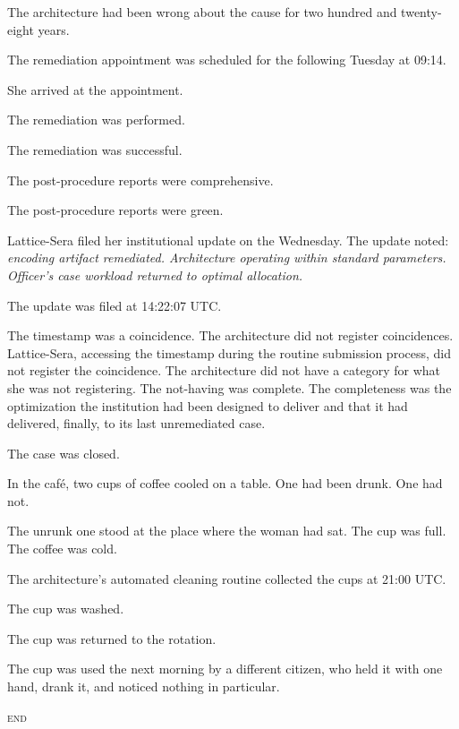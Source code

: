 The architecture had been wrong about the cause for two hundred and twenty-eight years.

\quietbreak

The remediation appointment was scheduled for the following Tuesday at 09:14.

She arrived at the appointment.

The remediation was performed.

The remediation was successful.

The post-procedure reports were comprehensive.

The post-procedure reports were green.

\quietbreak

Lattice-Sera filed her institutional update on the Wednesday. The update noted: \emph{encoding artifact remediated. Architecture operating within standard parameters. Officer's case workload returned to optimal allocation.}

The update was filed at 14:22:07 UTC.

The timestamp was a coincidence. The architecture did not register coincidences. Lattice-Sera, accessing the timestamp during the routine submission process, did not register the coincidence. The architecture did not have a category for what she was not registering. The not-having was complete. The completeness was the optimization the institution had been designed to deliver and that it had delivered, finally, to its last unremediated case.

The case was closed.

\quietbreak

In the café, two cups of coffee cooled on a table. One had been drunk. One had not.

The unrunk one stood at the place where the woman had sat. The cup was full. The coffee was cold.

The architecture's automated cleaning routine collected the cups at 21:00 UTC.

The cup was washed.

The cup was returned to the rotation.

The cup was used the next morning by a different citizen, who held it with one hand, drank it, and noticed nothing in particular.

\bigskip
\bigskip

\begin{center}
\color{accent}{\large $\diamond$\hspace{2em}$\diamond$\hspace{2em}$\diamond$}

\vspace{2em}

\textcolor{accent}{\textsc{end}}
\end{center}
